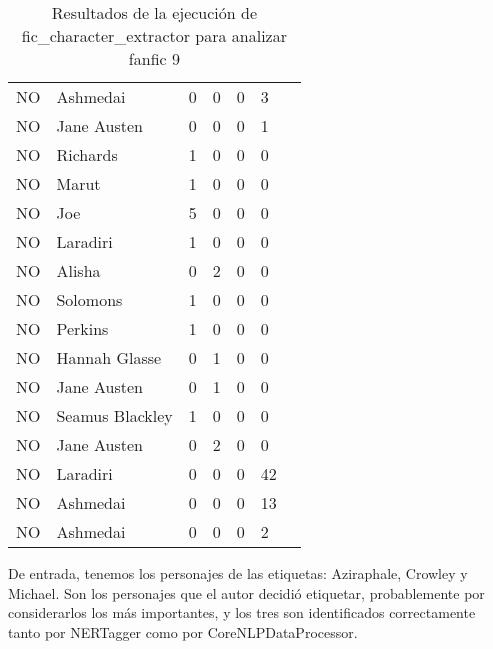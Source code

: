 \documentclass{pre-tfg}
\newcommand{\finalProgramName}{fic\_character\_extractor }
\begin{document}
\begin{table}
{\begin{tabular}{lllllll}
			NO       & Ashmedai       & 0     &   0   &   0      &  3   &       \\
			NO       & Jane Austen       & 0     &   0   &   0      &  1   &       \\
			NO       & Richards       & 1     &   0   &   0      &  0   &       \\
			NO       & Marut       & 1     &   0   &   0      &  0   &       \\
			NO       & Joe       & 5     &   0   &   0      &  0   &       \\
			NO       & Laradiri       & 1     &   0   &   0      &  0   &       \\
			NO       & Alisha       & 0     &   2   &   0      &  0   &       \\
			NO       & Solomons       & 1     &   0   &   0      &  0   &       \\
			NO       & Perkins       & 1     &   0   &   0      &  0   &       \\
			NO       & Hannah Glasse       & 0     &   1   &   0      &  0   &       \\
			NO       & Jane Austen       & 0     &   1   &   0      &  0  &       \\
			NO       & Seamus Blackley       & 1    &   0   &   0      &  0   &       \\
			NO       & Jane Austen       & 0     &   2   &   0      &  0   &       \\
			NO       & Laradiri       & 0     &   0   &   0      &  42   &       \\
			NO       & Ashmedai       & 0     &   0   &   0      &  13   &       \\
			NO       & Ashmedai       & 0     &   0   &   0      &  2  &       \\
		\end{tabular}%
	}
	\caption{Resultados de la ejecución de \finalProgramName para analizar fanfic 9}
	\label{table:eval1_nercorenlp}
\end{table}

De entrada, tenemos los personajes de las etiquetas: Aziraphale, Crowley y Michael. Son los personajes que el autor decidió etiquetar, probablemente por considerarlos los más importantes, y los tres son identificados correctamente tanto por NERTagger como por CoreNLPDataProcessor.
\end{document}
